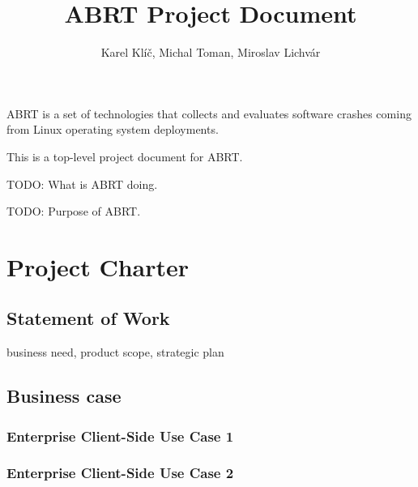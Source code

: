 \documentclass{article}
\title{ABRT Project Document}
\author{Karel Klíč, Michal Toman, Miroslav Lichvár}
\begin{document}
\maketitle

ABRT is a set of technologies that collects and evaluates software
crashes coming from Linux operating system deployments.

This is a top-level project document for ABRT.

TODO: What is ABRT doing.

TODO: Purpose of ABRT.

\cleardoublepage
\tableofcontents

\cleardoublepage
\section{Project Charter}

\subsection{Statement of Work}

business need, product scope, strategic plan

\subsection{Business case}

\subsubsection{Enterprise Client-Side Use Case 1}


\subsubsection{Enterprise Client-Side Use Case 2}
\end{document}
